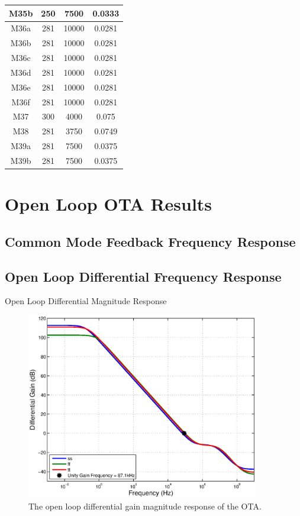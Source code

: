 \documentclass[journal]{IEEEtran}
\begin{document}
\begin{table}
\begin{tabular}{|c|c|c|c|}
\hline M35b & 250 & 7500 & 0.0333  \\
\hline M36a & 281 & 10000 & 0.0281 \\
\hline M36b & 281 & 10000 & 0.0281 \\
\hline M36c & 281 & 10000 & 0.0281 \\
\hline M36d & 281 & 10000 & 0.0281 \\
\hline M36e & 281 & 10000 & 0.0281 \\
\hline M36f & 281 & 10000 & 0.0281 \\
\hline M37 & 300 & 4000 & 0.075 \\
\hline M38 & 281 & 3750 & 0.0749 \\
\hline M39a & 281 & 7500 & 0.0375 \\
\hline M39b & 281 & 7500 & 0.0375 \\
\hline 
\end{tabular} 
\end{table}

\section{Open Loop OTA Results}
\subsection{Common Mode Feedback Frequency Response}

\subsection{Open Loop Differential Frequency Response}
Open Loop Differential Magnitude Response

\begin{figure}
\centering
\includegraphics[width=4in]{Plots/open_dm_gain.eps}
\caption{The open loop differential gain magnitude response of the OTA.}
\label{fig:open_dm_gain}
\end{figure}
\end{document}

